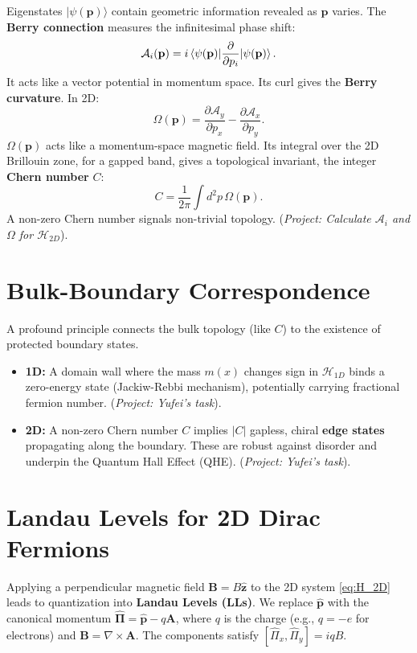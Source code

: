 \documentclass[11pt]{article}
\newcommand{\pd}{\partial}
\newcommand{\Hc}{\mathcal{H}}       %
\begin{document}
Eigenstates $|\psi(\mathbf{p})\rangle$ contain geometric information revealed as $\mathbf{p}$ varies. The \textbf{Berry connection} measures the infinitesimal phase shift:
\begin{equation}
\mathcal{A}_i(\mathbf{p}) = i \braket{\psi(\mathbf{p}) | \frac{\pd}{\pd p_i} | \psi(\mathbf{p})}.
\label{eq:berry_connection}
\end{equation}
It acts like a vector potential in momentum space. Its curl gives the \textbf{Berry curvature}. In 2D:
\begin{equation}
\Omega(\mathbf{p}) = \frac{\pd \mathcal{A}_y}{\pd p_x} - \frac{\pd \mathcal{A}_x}{\pd p_y}.
\label{eq:berry_curvature_2D}
\end{equation}
$\Omega(\mathbf{p})$ acts like a momentum-space magnetic field. Its integral over the 2D Brillouin zone, for a gapped band, gives a topological invariant, the integer \textbf{Chern number} $C$:
\begin{equation}
C = \frac{1}{2\pi} \int d^2p \, \Omega(\mathbf{p}).
\label{eq:chern_number}
\end{equation}
A non-zero Chern number signals non-trivial topology. (\textit{Project: Calculate $\mathcal{A}_i$ and $\Omega$ for $\Hc_{2D}$}).

\section{Bulk-Boundary Correspondence}

A profound principle connects the bulk topology (like $C$) to the existence of protected boundary states.
\begin{itemize}
    \item \textbf{1D:} A domain wall where the mass $m(x)$ changes sign in $\Hc_{1D}$ binds a zero-energy state (Jackiw-Rebbi mechanism), potentially carrying fractional fermion number. (\textit{Project: Yufei's task}).
    \item \textbf{2D:} A non-zero Chern number $C$ implies $|C|$ gapless, chiral \textbf{edge states} propagating along the boundary. These are robust against disorder and underpin the Quantum Hall Effect (QHE). (\textit{Project: Yufei's task}).
\end{itemize}

\section{Landau Levels for 2D Dirac Fermions}

Applying a perpendicular magnetic field $\mathbf{B} = B \hat{\mathbf{z}}$ to the 2D system \eqref{eq:H_2D} leads to quantization into \textbf{Landau Levels (LLs)}. We replace $\hat{\mathbf{p}}$ with the canonical momentum $\hat{\mathbf{\Pi}} = \hat{\mathbf{p}} - q\mathbf{A}$, where $q$ is the charge (e.g., $q=-e$ for electrons) and $\mathbf{B} = \nabla \times \mathbf{A}$. The components satisfy $[\hat{\Pi}_x, \hat{\Pi}_y] = i q B$.
\end{document}
